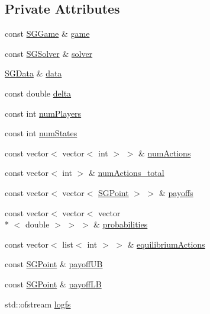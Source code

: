\subsection*{Private Attributes}
\begin{DoxyCompactItemize}
\item 
const \hyperlink{classSGGame}{S\-G\-Game} \& \hyperlink{classSGApproximation_a3244a3d7de5f2b909d438f5b4ab337ee}{game}
\item 
const \hyperlink{classSGSolver}{S\-G\-Solver} \& \hyperlink{classSGApproximation_a0f3be9758c5ee97b4fafd7d15e9f3c88}{solver}
\item 
\hyperlink{classSGData}{S\-G\-Data} \& \hyperlink{classSGApproximation_a5b38e362e6520eeb30f1bd446e2fb70e}{data}
\item 
const double \hyperlink{classSGApproximation_a2db391ef9ba9edc0313ddfd627bf6d48}{delta}
\item 
const int \hyperlink{classSGApproximation_aad4f5b13c4d578cc7a2c9d2290de2524}{num\-Players}
\item 
const int \hyperlink{classSGApproximation_a5de424fc814b5770fedc453052d61d3b}{num\-States}
\item 
const vector$<$ vector$<$ int $>$ $>$ \& \hyperlink{classSGApproximation_af6ee6afd52c29d6c81f29a4e35c40771}{num\-Actions}
\item 
const vector$<$ int $>$ \& \hyperlink{classSGApproximation_abcd0b34194cd55fca5361bb1c6d3a5e3}{num\-Actions\-\_\-total}
\item 
const vector$<$ vector$<$ \hyperlink{classSGPoint}{S\-G\-Point} $>$ $>$ \& \hyperlink{classSGApproximation_aad5b271ff927a7f21080aab138cdd471}{payoffs}
\item 
const vector$<$ vector$<$ vector\\*
$<$ double $>$ $>$ $>$ \& \hyperlink{classSGApproximation_a82aefba3c77e331995e53b6692af4ada}{probabilities}
\item 
const vector$<$ list$<$ int $>$ $>$ \& \hyperlink{classSGApproximation_a1fffdb10af241d7c2e8591b661435c3d}{equilibrium\-Actions}
\item 
const \hyperlink{classSGPoint}{S\-G\-Point} \& \hyperlink{classSGApproximation_a1b9d13241c1d3757f70099e3d6c279f5}{payoff\-U\-B}
\item 
const \hyperlink{classSGPoint}{S\-G\-Point} \& \hyperlink{classSGApproximation_a730a565edb81ab25cf99b8af3e8781ef}{payoff\-L\-B}
\item 
std\-::ofstream \hyperlink{classSGApproximation_a3c938c255cddce7cc0483e223bf09b65}{logfs}
\item 

\end{DoxyCompactItemize}
